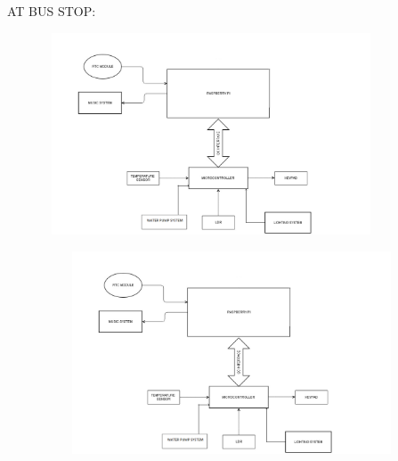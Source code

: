 \documentclass[12pt,a4paper,oneside]{report}
\begin{document}
\begin{onehalfspacing}
AT BUS STOP:



\begin{figure}[h]
\begin{center}
\leavevmode
\includegraphics[width=10cm, height=6cm]{fig2.png}
\end{center}
\label{fig2}
\end{figure}

\begin{figure}[h]
\begin{center}
\leavevmode
\includegraphics[width=15cm, height=6cm]{fig3.png}
\end{center}

\label{fig3}
\end{figure}

\newpage

\end{onehalfspacing}
\end{document}
